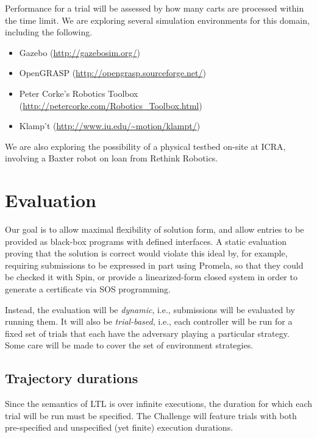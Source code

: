 \documentclass{amsart}
\theoremstyle{definition}
\begin{document}
Performance for a trial will be assessed by how many carts are processed within the time limit.
We are exploring several simulation environments for this domain, including the following.
\begin{itemize}
\item Gazebo (\url{http://gazebosim.org/})
\item OpenGRASP (\url{http://opengrasp.sourceforge.net/})
\item Peter Corke's Robotics Toolbox
(\url{http://petercorke.com/Robotics_Toolbox.html})
\item Klamp't (\url{http://www.iu.edu/~motion/klampt/})
\end{itemize}

We are also exploring the possibility of a physical testbed on-site at ICRA, involving a Baxter robot
on loan from Rethink Robotics.

\section{Evaluation}
Our goal is to allow maximal flexibility of solution form, and allow entries to be provided as black-box 
programs with defined interfaces. A static evaluation proving that the solution is correct would violate this 
ideal by, for example, requiring submissions to be expressed in part using Promela, so that they could be 
checked it with Spin, or provide a linearized-form closed system in order to generate a certificate via SOS 
programming.

Instead, the evaluation will be \emph{dynamic}, i.e., submissions will be evaluated by running them. It will also be 
\emph{trial-based}, i.e., each controller will be run for a fixed set of trials that each have the adversary playing a 
particular strategy. Some care will be made to cover the set of environment strategies.


\subsection{Trajectory durations}
Since the semantics of LTL is over infinite executions, the duration for which each trial will be run must be specified. 
The Challenge will feature trials with both pre-specified and unspecified (yet finite) execution durations. 
\end{document}
